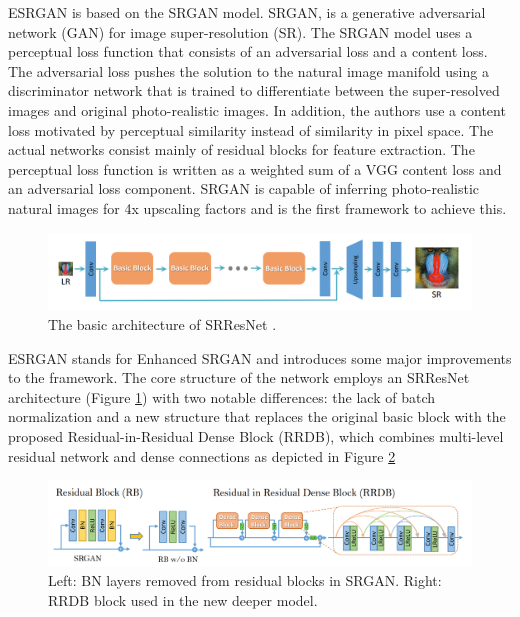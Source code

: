 ESRGAN is based on the SRGAN \cite{ledig2017photorealistic} model. SRGAN, is a generative adversarial network (GAN) for image super-resolution (SR). The SRGAN model uses a perceptual loss function that consists of an adversarial loss and a content loss. The adversarial loss pushes the solution to the natural image manifold using a discriminator network that is trained to differentiate between the super-resolved images and original photo-realistic images. In addition, the authors use a content loss motivated by perceptual similarity instead of similarity in pixel space. The actual networks consist mainly of residual blocks for feature extraction. The perceptual loss function is written as a weighted sum of a VGG content loss and an adversarial loss component. SRGAN is capable of inferring photo-realistic natural images for 4x upscaling factors and is the first framework to achieve this.

\begin{figure}[H]
  \centering
  \includegraphics[scale=0.25]{figures/SRResNet.png}
  \caption{The basic architecture of SRResNet \cite{wang2018esrgan}.}
  \label{img:SRResNet}
\end{figure}

ESRGAN stands for Enhanced SRGAN and introduces some major improvements to the framework. The core structure of the network employs an SRResNet architecture (Figure \ref{img:SRResNet}) with two notable differences: the lack of batch normalization and a new structure that replaces the original basic block with the proposed Residual-in-Residual Dense Block (RRDB), which combines multi-level residual network and dense
connections as depicted in Figure \ref{img:RRDB}

\begin{figure}[H]
  \centering
  \includegraphics[scale=0.25]{figures/RRDB.png}
  \caption{Left: BN layers removed from residual blocks in SRGAN. Right: RRDB block used in the new deeper model. \cite{wang2018esrgan}}
  \label{img:RRDB}
\end{figure}


